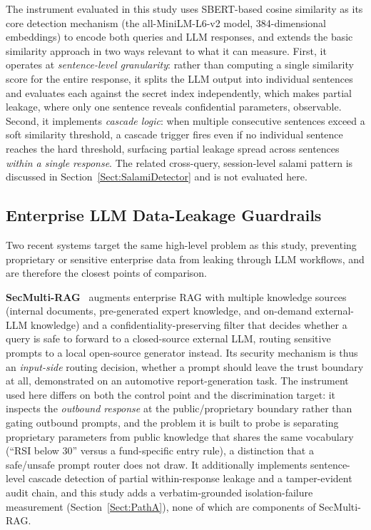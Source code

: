 \documentclass[journal]{IEEEtran}
\begin{document}
The instrument evaluated in this study uses SBERT-based cosine similarity as its core detection mechanism (the all-MiniLM-L6-v2 model, 384-dimensional embeddings) to encode both queries and LLM responses, and extends the basic similarity approach in two ways relevant to what it can measure. First, it operates at \textit{sentence-level granularity}: rather than computing a single similarity score for the entire response, it splits the LLM output into individual sentences and evaluates each against the secret index independently, which makes partial leakage, where only one sentence reveals confidential parameters, observable. Second, it implements \textit{cascade logic}: when multiple consecutive sentences exceed a soft similarity threshold, a cascade trigger fires even if no individual sentence reaches the hard threshold, surfacing partial leakage spread across sentences \textit{within a single response}. The related cross-query, session-level salami pattern is discussed in Section~\ref{Sect:SalamiDetector} and is not evaluated here.

\subsection{Enterprise LLM Data-Leakage Guardrails}
\label{Sect:LR_Enterprise}

Two recent systems target the same high-level problem as this study, preventing proprietary or sensitive enterprise data from leaking through LLM workflows, and are therefore the closest points of comparison.

\textbf{SecMulti-RAG}~\cite{secmulti_rag} augments enterprise RAG with multiple knowledge sources (internal documents, pre-generated expert knowledge, and on-demand external-LLM knowledge) and a confidentiality-preserving filter that decides whether a query is safe to forward to a closed-source external LLM, routing sensitive prompts to a local open-source generator instead. Its security mechanism is thus an \textit{input-side} routing decision, whether a prompt should leave the trust boundary at all, demonstrated on an automotive report-generation task. The instrument used here differs on both the control point and the discrimination target: it inspects the \textit{outbound response} at the public/proprietary boundary rather than gating outbound prompts, and the problem it is built to probe is separating proprietary parameters from public knowledge that shares the same vocabulary (``RSI below 30'' versus a fund-specific entry rule), a distinction that a safe/unsafe prompt router does not draw. It additionally implements sentence-level cascade detection of partial within-response leakage and a tamper-evident audit chain, and this study adds a verbatim-grounded isolation-failure measurement (Section~\ref{Sect:PathA}), none of which are components of SecMulti-RAG.
\end{document}
